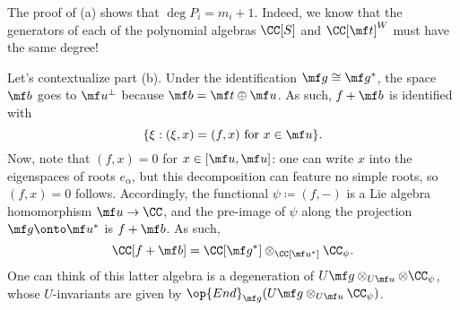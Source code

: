 \documentclass[../notes.tex]{subfiles}
\begin{document}
\begin{remark}
	The proof of (a) shows that $\deg P_i=m_i+1$. Indeed, we know that the generators of each of the polynomial algebras $\CC[S]$ and $\CC[\mf t]^W$ must have the same degree!
\end{remark}
\begin{remark}
	Let's contextualize part (b). Under the identification $\mf g\cong\mf g^*$, the space $\mf b$ goes to $\mf u^\perp$ because $\mf b=\mf t\oplus\mf u$. As such, $f+\mf b$ is identified with
	\[\{\xi:(\xi,x)=(f,x)\text{ for }x\in\mf u\}.\]
	Now, note that $(f,x)=0$ for $x\in[\mf u,\mf u]$: one can write $x$ into the eigenspaces of roots $e_\alpha$, but this decomposition can feature no simple roots, so $(f,x)=0$ follows. Accordingly, the functional $\psi\coloneqq(f,-)$ is a Lie algebra homomorphism $\mf u\to\CC$, and the pre-image of $\psi$ along the projection $\mf g\onto\mf u^*$ is $f+\mf b$. As such,
	\[\CC[f+\mf b]=\CC[\mf g^*]\otimes_{\CC[\mf u^*]}\CC_\psi.\]
	One can think of this latter algebra is a degeneration of $U\mf g\otimes_{U\mf u}\otimes\CC_\psi$, whose $U$-invariants are given by $\op{End}_{\mf g}(U\mf g\otimes_{U\mf u}\CC_\psi)$.
\end{remark}
\end{document}
